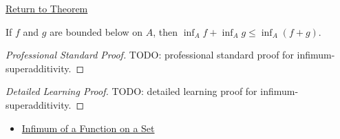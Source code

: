 \newpage
{}
\label{prf:infimum-superadditivity}

\begin{remark*}[Return]
\hyperref[thm:infimum-superadditivity]{Return to Theorem}
\end{remark*}

\begin{theorem*}
If \(f\) and \(g\) are bounded below on \(A\), then \(\inf_A f+\inf_A g\leq\inf_A(f+g)\).
\end{theorem*}

\begin{proof}[Professional Standard Proof]
\LRAProofBodyStart
TODO: professional standard proof for infimum-superadditivity.
\end{proof}

\begin{proof}[Detailed Learning Proof]
\LRAProofBodyStart
TODO: detailed learning proof for infimum-superadditivity.
\end{proof}

\begin{remark*}
\end{remark*}

\begin{dependencies}
\begin{itemize}
  \item \hyperref[def:function-infimum-on-set]{Infimum of a Function on a Set}
\end{itemize}
\end{dependencies}

\clearpage
